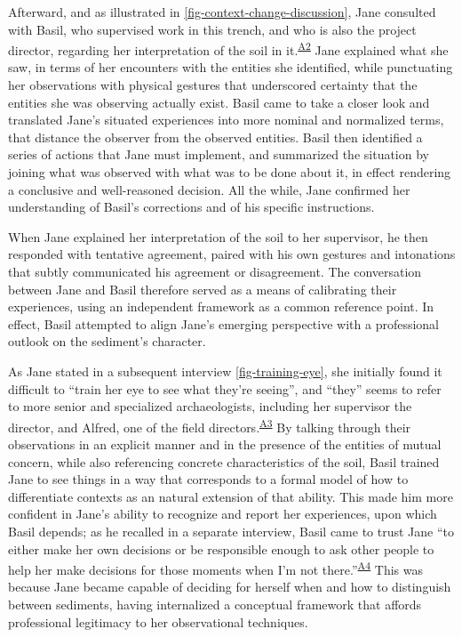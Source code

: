 \documentclass{article}
\begin{document}
Afterward, and as illustrated in
\autoref{fig-context-change-discussion}, Jane consulted with Basil, who
supervised work in this trench, and who is also the project director,
regarding her interpretation of the soil in
it.\textsuperscript{\hyperref[sec-A2]{A2}} Jane explained what she saw,
in terms of her encounters with the entities she identified, while
punctuating her observations with physical gestures that underscored
certainty that the entities she was observing actually exist. Basil came
to take a closer look and translated Jane's situated experiences into
more nominal and normalized terms, that distance the observer from the
observed entities. Basil then identified a series of actions that Jane
must implement, and summarized the situation by joining what was
observed with what was to be done about it, in effect rendering a
conclusive and well-reasoned decision. All the while, Jane confirmed her
understanding of Basil's corrections and of his specific instructions.

When Jane explained her interpretation of the soil to her supervisor, he
then responded with tentative agreement, paired with his own gestures
and intonations that subtly communicated his agreement or disagreement.
The conversation between Jane and Basil therefore served as a means of
calibrating their experiences, using an independent framework as a
common reference point. In effect, Basil attempted to align Jane's
emerging perspective with a professional outlook on the sediment's
character.

As Jane stated in a subsequent interview \autoref{fig-training-eye},
she initially found it difficult to ``train her eye to see what they're
seeing'', and ``they'' seems to refer to more senior and specialized
archaeologists, including her supervisor the director, and Alfred, one
of the field directors.\textsuperscript{\hyperref[sec-A3]{A3}} By
talking through their observations in an explicit manner and in the
presence of the entities of mutual concern, while also referencing
concrete characteristics of the soil, Basil trained Jane to see things
in a way that corresponds to a formal model of how to differentiate contexts as an natural extension of that ability. This made
him more confident in Jane's ability to recognize and report her
experiences, upon which Basil depends; as he recalled in a separate
interview, Basil came to trust Jane ``to either make her own decisions
or be responsible enough to ask other people to help her make decisions
for those moments when I'm not
there.''\textsuperscript{\hyperref[sec-A4]{A4}} This was because Jane
became capable of deciding for herself when and how to distinguish
between sediments, having internalized a conceptual framework that
affords professional legitimacy to her observational techniques.
\end{document}
